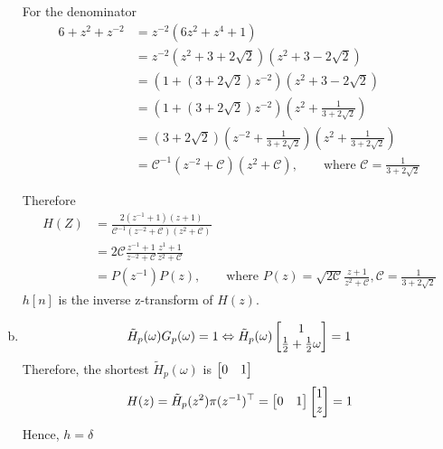 \begin{enumerate}[(a)]
For the denominator
\begin{align*}
	6 + z^2 + z^{-2}
	&= z^{-2}(6z^2 + z^4 + 1) \\
	&= z^{-2}(z^2 + 3+2\sqrt{2})(z^2 + 3-2\sqrt{2})\\
	&= (1 + (3+2\sqrt{2})z^{-2})(z^2 + 3-2\sqrt{2})\\
	&= (1 + (3+2\sqrt{2})z^{-2})\left(z^2 + \frac{1}{3+2\sqrt{2}}\right)\\
	&= (3+2\sqrt{2})\left(z^{-2} + \frac{1}{3+2\sqrt{2}}\right)\left(z^2 + \frac{1}{3+2\sqrt{2}}\right)\\
	&= \mathcal{C}^{-1}(z^{-2} + \mathcal{C})(z^2 + \mathcal{C}), \qquad \text{where } \mathcal{C}=\frac{1}{3+2\sqrt{2}}
\end{align*}

Therefore
\begin{align*}
	H(Z)
	&=\frac{2(z^{-1}+1)(z+1)}{\mathcal{C}^{-1}(z^{-2} + \mathcal{C})(z^2 + \mathcal{C})} \\
	&= 2\mathcal{C}\frac{z^{-1}+1}{z^{-2}+\mathcal{C}}\frac{z^{1}+1}{z^{2}+\mathcal{C}} \\
	&= P(z^{-1})P(z), \qquad \text{where } P(z) = \sqrt{2\mathcal{C}}\frac{z+1}{z^2 + \mathcal{C}}, \mathcal{C} = \frac{1}{3+2\sqrt{2}}
\end{align*}
$h[n]$ is the inverse z-transform of $H(z)$.

\item 
\[\tilde{H}_p(\omega) G_p(\omega) = 1 \Leftrightarrow \tilde{H}_p(\omega) \begin{bmatrix} 1 \\ \frac{1}{2}+\frac{1}{2}\omega \end{bmatrix} = 1\]
Therefore, the shortest $\tilde{H}_p(\omega)$ is $\begin{bmatrix} 0 & 1 \end{bmatrix}$
\[H(z) = \tilde{H}_p(z^2) \pi(z^{-1})^\top = \begin{bmatrix} 0 & 1 \end{bmatrix}\begin{bmatrix} 1 \\ z \end{bmatrix} = 1 \]
Hence, $h = \delta$
\end{enumerate}